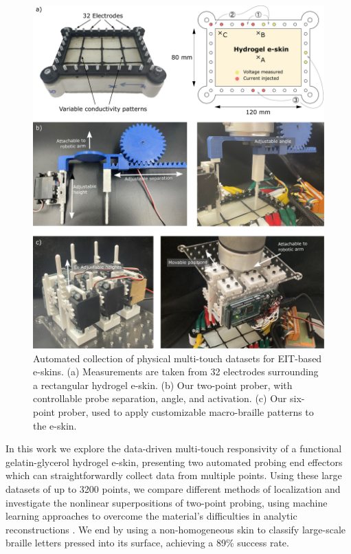 \begin{figure}[htbp]
  \centering
  \includegraphics[width=\linewidth]{Images/MultiTouchIntro.pdf}
  \caption{Automated collection of physical multi-touch datasets for EIT-based e-skins. (a) Measurements are taken from 32 electrodes surrounding a rectangular hydrogel e-skin. (b) Our two-point prober, with controllable probe separation, angle, and activation. (c) Our six-point prober, used to apply customizable macro-braille patterns to the e-skin.}
  \label{fig:intro}
\end{figure}


In this work we explore the data-driven multi-touch responsivity of a functional gelatin-glycerol hydrogel e-skin, presenting two automated probing end effectors which can straightforwardly collect data from multiple points. Using these large datasets of up to 3200 points, we compare different methods of localization and investigate the nonlinear superpositions of two-point probing, using machine learning approaches to overcome the material's difficulties in analytic reconstructions \cite{hardman2023tactile}. We end by using a non-homogeneous skin to classify large-scale braille letters pressed into its surface, achieving a 89\% success rate.

